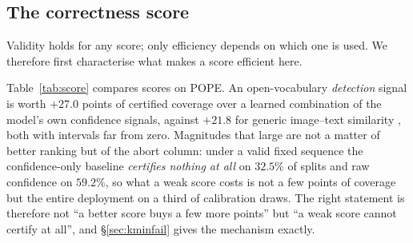 \documentclass[review,number,doubleblind]{elsarticle}
\theoremstyle{plain}
\theoremstyle{definition}
\theoremstyle{remark}
\begin{document}
\subsection{The correctness score}
\label{sec:score}

Validity holds for any score; only efficiency depends on which one is used. We therefore
first characterise what makes a score efficient here.

Table~\ref{tab:score} compares scores on POPE. An open-vocabulary \emph{detection} signal is
worth $+27.0$ points of certified coverage over a learned combination of the model's own
confidence signals, against $+21.8$ for generic image--text similarity \citep{clip}, both with
intervals far from zero. Magnitudes that large are not a matter of better ranking but of the
abort column: under a valid fixed sequence the confidence-only baseline \emph{certifies nothing
at all} on $32.5\%$ of splits and raw confidence on $59.2\%$, so what a weak score costs is not
a few points of coverage but the entire deployment on a third of calibration draws. The right
statement is therefore not ``a better score buys a few more points'' but ``a weak score cannot
certify at all'', and \S\ref{sec:kminfail} gives the mechanism exactly.

\begin{table}[t]
\centering
\caption{Selective prediction on POPE (LLaVA-1.5-7B, $n=1500$, $400$ paired splits). AURC is
area under the risk--coverage curve (lower better). ``abort'' is the fraction of splits on which
the fixed sequence certifies nothing and the deployed system covers $0\%$; coverage is the mean
over all splits including those, so a large abort rate is visible as a large standard deviation.
Gains in the last column are paired differences against the confidence-only row with $95\%$ CIs;
all have $p<10^{-40}$ (two-sided paired $t$). The validity audit for these arms is
Table~\ref{tab:audit}.}
\label{tab:score}
\small
{}
\end{table}
\end{document}
